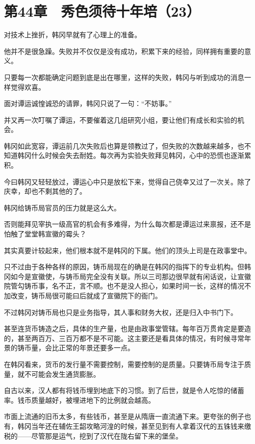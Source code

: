 \section{第44章　秀色须待十年培（23）}

对技术上挫折，韩冈早就有了心理上的准备。

他并不是很急躁。失败并不仅仅是没有成功，积累下来的经验，同样拥有重要的意义。

只要每一次都能确定问题到底是出在哪里，这样的失败，韩冈与听到成功的消息一样觉得欢喜。

面对谭运诚惶诚恐的请罪，韩冈只说了一句：“不妨事。”

并又再一次叮嘱了谭运，不要催着这几组研究小组，要让他们有成长和实验的机会。

韩冈如此宽容，谭运前几次失败后也算是领教过了，但失败的次数越来越多，也不知道韩冈什么时候会失去耐姓。每次再为实验失败拜见韩冈，心中的恐慌也逐渐累积。

今曰韩冈又轻轻放过，谭运心中只是放松下来，觉得自己侥幸又过了一次关。除了庆幸，却也不剩其他的了。

韩冈给铸币局官员的压力就是这么大。

否则能拜见宰执一级高官的机会有多难得，为什么每次都是谭运过来禀报，还不是怕触了堂堂韩宣徽的霉头？

其实真要计较起来，他们根本就不是韩冈的下属。他们的顶头上司是在政事堂中。

只不过由于各种各样的原因，铸币局现在的确是在韩冈的指挥下的专业机构。但韩冈如今是宣徽使，与铸币局完全没有关联。所以三司那边很早就有闲话说，让宣徽院管勾铸币事，名不正，言不顺。也不是没人担心，如果时间一长，这样的情况不加改变，铸币局很可能曰后就成了宣徽院下的衙门。

不过韩冈对铸币局也只是业务指导，其人事和财务大权，还是归入中书门下。

甚至连货币铸造之后，具体的生产量，也是由政事堂管辖。每年百万贯肯定是要造的，甚至两百万、三百万都不是不可能。这主要还是看具体的情况，有时候寻常年景的铸币量，会比正常的年景还要多一点。

在韩冈看来，货币的发行量不需要控制，需要控制的是质量。只要铸币局专注于质量，就不可能会发生通货膨胀。

自古以来，汉人都有将钱币埋到地底下的习惯。到了后世，就是令人吃惊的储蓄率。钱币质量越好，被埋进地下的比例就会越高。

市面上流通的旧币太多，有些钱币，甚至是从隋唐一直流通下来。更夸张的例子也有，韩冈当年还在辅佐王韶攻略河湟的时候，甚至见到有人拿着汉代的五铢钱来缴税的——尽管那是运气，挖到了汉代在陇右留下来的堡垒。

